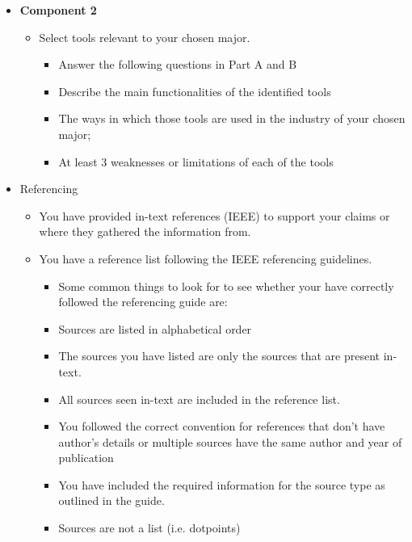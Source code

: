 \documentclass[a4paper, 11pt]{report}
\begin{document}
\begin{enumerate}
\begin{itemize}
\item \textbf{Component 2}
	\begin{itemize}
	\item Select tools relevant to your chosen major. 
        \begin{itemize}
            \item Answer the following questions in Part A and B
            \item Describe the main functionalities of the identified tools
            \item The ways in which those tools are used in the industry of your chosen major;
            \item At least 3 weaknesses or limitations of each of the tools
        \end{itemize}
    \end{itemize}
\item Referencing
	\begin {itemize}
	\item You have provided in-text references (IEEE) to support your claims or where they gathered the information from.
	\item You have a reference list following the IEEE referencing guidelines.
		\begin{itemize}
    		\item Some common things to look for to see whether your have correctly followed the referencing guide are:
    		\item Sources are listed in alphabetical order
    		\item The sources you have listed are only the sources that are present in-text.
    		\item All sources seen in-text are included in the reference list.
    		\item You followed the correct convention for references that don’t have author’s details or multiple sources have the same author and year of publication
    		\item You have included the required information for the source type as outlined in the guide.
    		\item Sources are not a list (i.e. dotpoints)
		\end{itemize}
	\end{itemize}
\end{itemize}


\end{enumerate}
\end{document}
